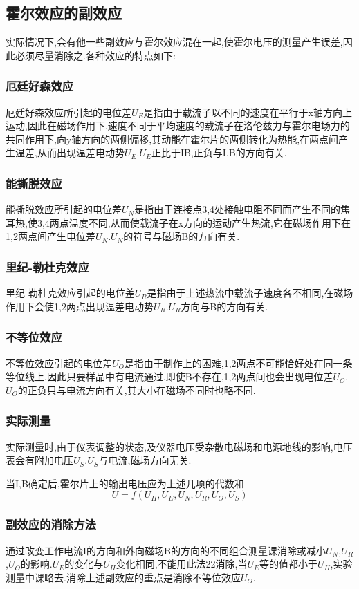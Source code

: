 \documentclass{thuemp}
\begin{document}
\subsection{霍尔效应的副效应}
实际情况下,会有他一些副效应与霍尔效应混在一起,使霍尔电压的测量产生误差,因此必须尽量消除之.各种效应的特点如下:
\subsubsection{厄廷好森效应}
厄廷好森效应所引起的电位差$U_{E}$是指由于载流子以不同的速度在平行于x轴方向上运动,因此在磁场作用下,速度不同于平均速度的载流子在洛伦兹力与霍尔电场力的共同作用下,向y轴方向的两侧偏移,其动能在霍尔片的两侧转化为热能,在两点间产生温差,从而出现温差电动势$U_{E}$.$U_{E}$正比于IB,正负与I,B的方向有关.
\subsubsection{能撕脱效应}
能撕脱效应所引起的电位差$U_{N}$是指由于连接点3,4处接触电阻不同而产生不同的焦耳热,使3,4两点温度不同,从而使载流子在x方向的运动产生热流,它在磁场作用下在1,2两点间产生电位差$U_{N}$.$U_{N}$的符号与磁场B的方向有关.
\subsubsection{里纪-勒杜克效应}
里纪-勒杜克效应引起的电位差$U_{R}$是指由于上述热流中载流子速度各不相同,在磁场作用下会使1,2两点出现温差电动势$U_{R}$.$U_{R}$方向与B的方向有关.
\subsubsection{不等位效应}
不等位效应引起的电位差$U_{O}$是指由于制作上的困难,1,2两点不可能恰好处在同一条等位线上,因此只要样品中有电流通过,即使B不存在,1,2两点间也会出现电位差$U_{O}$.$U_{O}$的正负只与电流方向有关,其大小在磁场不同时也略不同.
\subsubsection{实际测量}
实际测量时,由于仪表调整的状态,及仪器电压受杂散电磁场和电源地线的影响,电压表会有附加电压$U_{S}$.$U_{S}$与电流,磁场方向无关.


当I,B确定后,霍尔片上的输出电压应为上述几项的代数和
\[U=f(U_{H},U_{E},U_{N},U_{R},U_{O},U_{S})\]
\subsubsection{副效应的消除方法}
通过改变工作电流I的方向和外向磁场B的方向的不同组合测量课消除或减小$U_{N}$,$U_{R}$,$U_{O}$的影响.$U_{E}$的变化与$U_{H}$变化相同,不能用此法22消除,当$U_{E}$等的值都小于$U_{H}$,实验测量中课略去.消除上述副效应的重点是消除不等位效应$U_{O}$.
\end{document}
